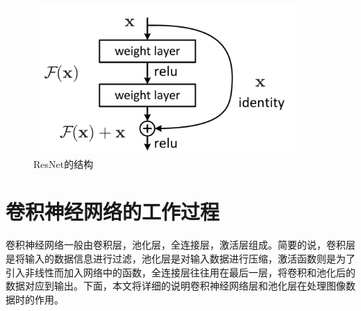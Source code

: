 \begin{figure}
\centering
\includegraphics[width=10cm]{./figures/ResNet.PNG}
\caption{ResNet的结构\cite{he2016deep}}
\label{fig:Res}
\end{figure}


\section{卷积神经网络的工作过程}
卷积神经网络一般由卷积层，池化层，全连接层，激活层组成。简要的说，卷积层是将输入的数据信息进行过滤，池化层是对输入数据进行压缩，激活函数则是为了引入非线性而加入网络中的函数，全连接层往往用在最后一层，将卷积和池化后的数据对应到输出。下面，本文将详细的说明卷积神经网络层和池化层在处理图像数据时的作用。
